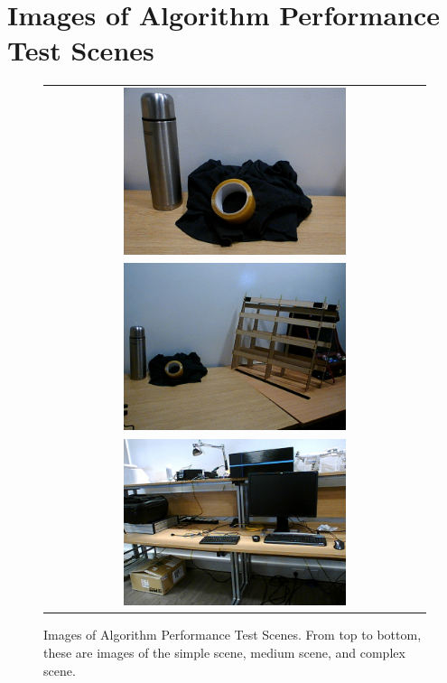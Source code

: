 \chapter{Images of Algorithm Performance Test Scenes}
\label{Appendix:scenes}
        
\begin{figure}[ht]
    \begin{center}
    \begin{tabular}{ c }
        \includegraphics[width=0.6\textwidth]{Figures/simple.jpg} \\
        \includegraphics[width=0.6\textwidth]{Figures/medium.jpg} \\
        \includegraphics[width=0.6\textwidth]{Figures/complex.jpg} 
    \end{tabular}
    \caption[Images of Algorithm Performance Test Scenes]{Images of Algorithm Performance Test Scenes. From top to bottom, these are images of the simple scene, medium scene, and complex scene.}
    \label{fig:scenes}
    \end{center}
\end{figure}